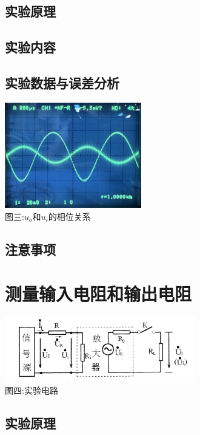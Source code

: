 \documentclass[a4paper]{article}
\begin{document}
    \subsection{实验原理}\label{subsec:5}

    \subsection{实验内容}\label{subsec:6}

    \subsection{实验数据与误差分析}\label{subsec:7}
    \begin{center}
        \includegraphics[height=130pt]{ref}\\
        {\small 图三:$u_o$和$u_i$的相位关系}
    \end{center}

    \subsection{注意事项}\label{subsec:8}


    \section{测量输入电阻和输出电阻}\label{sec:5}
    \begin{center}
        \includegraphics[height=80pt]{R}\\
        {\small 图四:实验电路}
    \end{center}

    \subsection{实验原理}\label{subsec:9}
\end{document}
